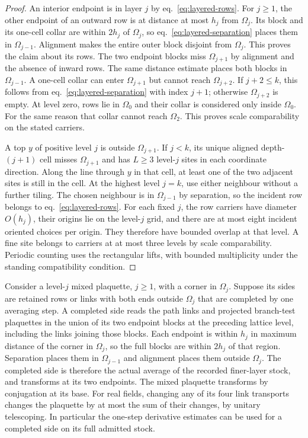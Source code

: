 \documentclass[11pt,letterpaper,reqno]{amsart}
\numberwithin{equation}{section}
\renewcommand{\eqref}[1]{\textup{eq.~\ref{#1}}}
\theoremstyle{definition}
\theoremstyle{remark}
\begin{document}
\begin{proof}
An interior endpoint is in layer $j$ by \eqref{eq:layered-rows}.
For $j\ge1$, the other endpoint of an outward row is at distance
at most $h_j$ from $\Omega_j$. Its block and its one-cell collar are within
$2h_j$ of $\Omega_j$, so \eqref{eq:layered-separation} places
them in $\Omega_{j-1}$. Alignment makes the entire outer block
disjoint from $\Omega_j$. This proves the claim about its rows.
The two endpoint blocks miss $\Omega_{j+1}$ by alignment and the
absence of inward rows. The same distance estimate places both
blocks in $\Omega_{j-1}$. A one-cell collar can enter
$\Omega_{j+1}$ but cannot reach $\Omega_{j+2}$. If $j+2\le k$, this
follows from \eqref{eq:layered-separation} with index $j+1$;
otherwise $\Omega_{j+2}$ is empty.
At level zero, rows lie in $\Omega_0$ and their collar is considered
only inside $\Omega_0$. For the same reason that collar cannot reach
$\Omega_2$. This proves scale comparability on the stated carriers.

A top $y$ of positive level $j$ is outside $\Omega_{j+1}$.
If $j<k$, its unique aligned
depth-$(j+1)$ cell misses $\Omega_{j+1}$ and has $L\ge3$ level-$j$ sites in each
coordinate direction. Along the line through $y$ in that cell, at
least one of the two adjacent sites is still in the cell. At the
highest level $j=k$, use either neighbour without a further tiling.
The chosen neighbour is in $\Omega_{j-1}$ by separation, so the incident row
belongs to \eqref{eq:layered-rows}. For each fixed $j$, the row carriers
have diameter $O(h_j)$, their origins lie on the level-$j$ grid, and
there are at most eight incident oriented choices per origin. They
therefore have bounded overlap at that level. A fine site belongs to
carriers at at most three levels by scale comparability. Periodic
counting uses the rectangular lifts, with bounded multiplicity
under the standing compatibility condition.
\end{proof}

Consider a level-$j$ mixed plaquette, $j\ge1$, with a corner in
$\Omega_j$. Suppose its sides are retained rows or links with both
ends outside $\Omega_j$ that are completed by one averaging step.
A completed side reads the path links and projected branch-test
plaquettes in the union of its two endpoint blocks at the preceding
lattice level, including the links joining those blocks.
Each endpoint is within $h_j$ in
maximum distance of the corner in $\Omega_j$, so the full blocks are
within $2h_j$ of that region. Separation places them in $\Omega_{j-1}$
and alignment places them outside $\Omega_j$. The completed side is
therefore the actual average of the recorded finer-layer stock, and
transforms at its two endpoints. The mixed plaquette transforms by
conjugation at its base.
For real fields, changing any of its four link transports changes
the plaquette by at most the sum of their changes, by unitary
telescoping. In particular the one-step derivative estimates can be
used for a completed side on its full admitted stock.
\end{document}
